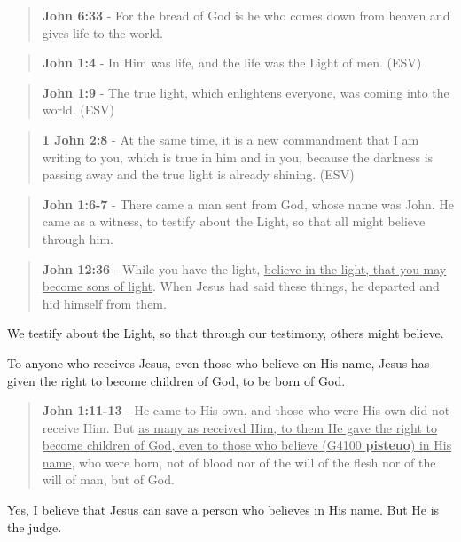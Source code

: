 \documentclass[11pt]{article}
\begin{document}
\begin{quote}
\textbf{John 6:33} - For the bread of God is he who comes down from heaven and gives life to the world.
\end{quote}

\begin{quote}
\textbf{John 1:4} - In Him was life, and the life was the Light of men. (ESV)
\end{quote}

\begin{quote}
\textbf{John 1:9} - The true light, which enlightens everyone, was coming into the world. (ESV)
\end{quote}

\begin{quote}
\textbf{1 John 2:8} -  At the same time, it is a new commandment that I am writing to you, which is true in him and in you, because the darkness is passing away and the true light is already shining.  (ESV)
\end{quote}

\begin{quote}
\textbf{John 1:6-7} - There came a man sent from God, whose name was John. He came as a witness, to testify about the Light, so that all might believe through him.
\end{quote}

\begin{quote}
\textbf{John 12:36} - While you have the light, \uline{believe in the light, that you may become sons of light}. When Jesus had said these things, he departed and hid himself from them.
\end{quote}

We testify about the Light, so that through our testimony, others might believe.

To anyone who receives Jesus, even those who believe on His name, Jesus has given the right to become children of God, to be born of God.

\begin{quote}
\textbf{John 1:11-13} - He came to His own, and those who were His own did not receive Him. But \uline{as many as received Him, to them He gave the right to become children of God, even to those who believe (G4100 \textbf{pisteuo}) in His name}, who were born, not of blood nor of the will of the flesh nor of the will of man, but of God.
\end{quote}

Yes, I believe that Jesus can save a person who believes in His name. But He is the judge.
\end{document}
